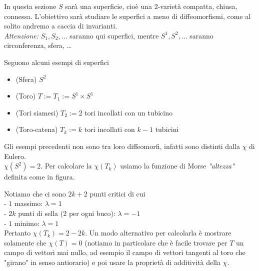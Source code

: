 

In questa sezione $S$ sarà una superficie, cioè una $2$-varietà compatta, chiusa, connessa. L'obiettivo sarà studiare le superfici a meno di diffeomorfismi, come al solito andremo a caccia di invarianti.\\
\emph{Attenzione:} $S_1, S_2, \dots$ saranno qui superfici, mentre $S^1, S^2, \dots$ saranno circonferenza, sfera, \dots

\begin{es} Seguono alcuni esempi di superfici
\begin{itemize}
\item (Sfera) $S^2$
\item (Toro) $T := T_1 := S^1 \times S^1$
\item (Tori siamesi) $T_2 := 2$ tori incollati con un tubicino
\begin{center}
  
\end{center}
\item (Toro-catena) $T_k := k$ tori incollati con $k-1$ tubicini
\begin{center}
  
\end{center}
\end{itemize}
\end{es}

\begin{oss}
Gli esempi precedenti non sono tra loro diffeomorfi, infatti sono distinti dalla $\chi$ di Eulero. \\
$\chi(S^2) = 2$. Per calcolare la $\chi(T_k)$ usiamo la funzione di Morse \emph{"altezza"} definita come in figura.
\begin{center}
  
\end{center}
Notiamo che ci sono $2k + 2$ punti critici di cui\\
- $1$ massimo: $\lambda = 1$ \\
- $2k$ punti di sella ($2$ per ogni buco): $\lambda = -1$ \\
- $1$ minimo: $\lambda = 1$ \\
Pertanto $\chi(T_k) = 2 - 2k$. Un modo alternativo per calcolarla è mostrare solamente che $\chi(T) = 0$ (notiamo in particolare che è facile trovare per $T$ un campo di vettori mai nullo, ad esempio il campo di vettori tangenti al toro che "girano" in senso antiorario) e poi usare la proprietà di additività della $\chi$.
\end{oss}

